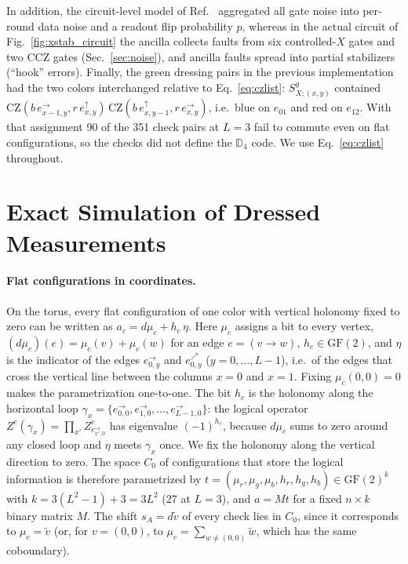 \documentclass[a4paper]{article}
\newcommand{\rd}{r}
\newcommand{\gr}{g}
\newcommand{\bl}{b}
\newcommand{\GF}{\mathrm{GF}(2)}
\newcommand{\eh}[1]{e^{\rightarrow}_{#1}}   %
\newcommand{\ev}[1]{e^{\uparrow}_{#1}}      %
\newcommand{\ed}[1]{e^{\nearrow}_{#1}}      %
\begin{document}
In addition, the circuit-level model of Ref.~\cite{haga2026aqis} aggregated all gate noise into per-round data noise and a readout flip probability $p$, whereas in the actual circuit of Fig.~\ref{fig:xstab_circuit} the ancilla collects faults from six controlled-$X$ gates and two CCZ gates (Sec.~\ref{sec:noise}), and ancilla faults spread into partial stabilizers (``hook'' errors). Finally, the green dressing pairs in the previous implementation had the two colors interchanged relative to Eq.~\eqref{eq:czlist}: $S^\gr_{X;(x,y)}$ contained $\mathrm{CZ}(\bl\,\eh{x-1,y},\rd\,\ev{x,y})\,\mathrm{CZ}(\bl\,\ev{x,y-1},\rd\,\eh{x,y})$, i.e.\ blue on $e_{01}$ and red on $e_{12}$. With that assignment 90 of the 351 check pairs at $L=3$ fail to commute even on flat configurations, so the checks did not define the $\mathbb{D}_4$ code. We use Eq.~\eqref{eq:czlist} throughout.

\section{Exact Simulation of Dressed Measurements}
\label{sec:method}

\paragraph{Flat configurations in coordinates.}
On the torus, every flat configuration of one color with vertical holonomy fixed to zero can be written as $a_c=d\mu_c+h_c\,\eta$. Here $\mu_c$ assigns a bit to every vertex, $(d\mu_c)(e)=\mu_c(v)+\mu_c(w)$ for an edge $e=(v\to w)$, $h_c\in\GF$, and $\eta$ is the indicator of the edges $\eh{0,y}$ and $\ed{0,y}$ ($y=0,\dots,L-1$), i.e.\ of the edges that cross the vertical line between the columns $x=0$ and $x=1$. Fixing $\mu_c(0,0)=0$ makes the parametrization one-to-one. The bit $h_c$ is the holonomy along the horizontal loop $\gamma_x=\{\eh{0,0},\eh{1,0},\dots,\eh{L-1,0}\}$: the logical operator $Z^c(\gamma_x)=\prod_{x'}Z^c_{\eh{x',0}}$ has eigenvalue $(-1)^{h_c}$, because $d\mu_c$ sums to zero around any closed loop and $\eta$ meets $\gamma_x$ once. We fix the holonomy along the vertical direction to zero. The space $C_0$ of configurations that store the logical information is therefore parametrized by $t=(\mu_\rd,\mu_\gr,\mu_\bl,h_\rd,h_\gr,h_\bl)\in\GF^k$ with $k=3(L^2-1)+3=3L^2$ (27 at $L=3$), and $a=Mt$ for a fixed $n\times k$ binary matrix $M$. The shift $s_A=d\tilde v$ of every check lies in $C_0$, since it corresponds to $\mu_c=\tilde v$ (or, for $v=(0,0)$, to $\mu_c=\sum_{w\neq(0,0)}\tilde w$, which has the same coboundary).
\end{document}
